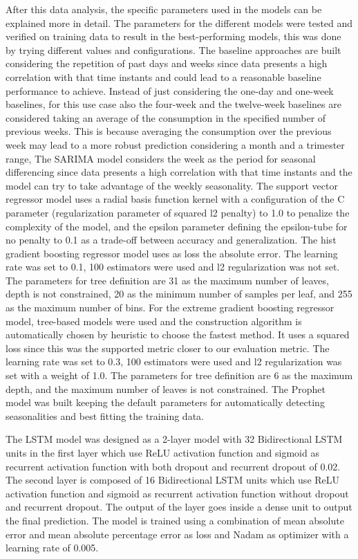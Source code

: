 After this data analysis, the specific parameters used in the models can be explained more in detail.
The parameters for the different models were tested and verified on training data to result in the best-performing models, this was done by trying different values and configurations.
The baseline approaches are built considering the repetition of past days and weeks since data presents a high correlation with that time instants and could lead to a reasonable baseline performance to achieve.
Instead of just considering the one-day and one-week baselines, for this use case also the four-week and the twelve-week baselines are considered taking an average of the consumption in the specified number of previous weeks.
This is because averaging the consumption over the previous week may lead to a more robust prediction considering a month and a trimester range,
The SARIMA model considers the week as the period for seasonal differencing since data presents a high correlation with that time instants and the model can try to take advantage of the weekly seasonality.
The support vector regressor model uses a radial basis function kernel with a configuration of the C parameter (regularization parameter of squared l2 penalty) to 1.0 to penalize the complexity of the model, and the epsilon parameter defining the epsilon-tube for no penalty to 0.1 as a trade-off between accuracy and generalization.
The hist gradient boosting regressor model uses as loss the absolute error.
The learning rate was set to 0.1, 100 estimators were used and l2 regularization was not set.
The parameters for tree definition are 31 as the maximum number of leaves, depth is not constrained, 20 as the minimum number of samples per leaf, and 255 as the maximum number of bins.
For the extreme gradient boosting regressor model, tree-based models were used and the construction algorithm is automatically chosen by heuristic to choose the fastest method.
It uses a squared loss since this was the supported metric closer to our evaluation metric.
The learning rate was set to 0.3, 100 estimators were used and l2 regularization was set with a weight of 1.0.
The parameters for tree definition are 6 as the maximum depth, and the maximum number of leaves is not constrained.
The Prophet model was built keeping the default parameters for automatically detecting seasonalities and best fitting the training data.

The LSTM model was designed as a 2-layer model with 32 Bidirectional LSTM units in the first layer which use ReLU activation function and sigmoid as recurrent activation function with both dropout and recurrent dropout of 0.02.
The second layer is composed of 16 Bidirectional LSTM units which use ReLU activation function and sigmoid as recurrent activation function without dropout and recurrent dropout.
The output of the layer goes inside a dense unit to output the final prediction.
The model is trained using a combination of mean absolute error and mean absolute percentage error as loss and Nadam as optimizer with a learning rate of 0.005.

